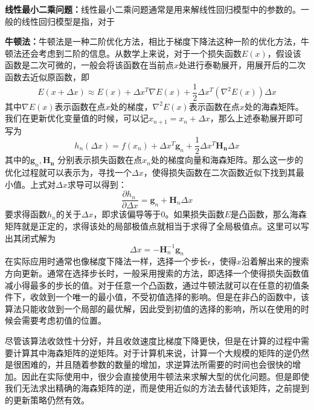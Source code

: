 \textbf{线性最小二乘问题：}线性最小二乘问题通常是用来解线性回归模型中的参数的。一般的线性回归模型是指，对于

\textbf{牛顿法：}牛顿法是一种二阶优化方法，相比于梯度下降法这种一阶的优化方法，牛顿法还会考虑到二阶的信息。从数学上来说，对于一个损失函数\(E(x)\)，假设该函数是二次可微的，一般会将该函数在当前点\(x\)处进行泰勒展开，用展开后的二次函数去近似原函数，即
\begin{equation}
    E(x+\Delta x) \approx E(x) + \Delta x^T \nabla E(x) + \frac{1}{2}\Delta x^T (\nabla^2 E(x))\Delta x
\end{equation}
其中\(\nabla E(x)\)表示函数在点\(x\)处的梯度，\(\nabla^2 E(x)\)表示函数在点\(x\)处的海森矩阵。我们在更新优化变量值的时候，可以记\(x_{n+1} = x_n + \Delta x\)，那么上述泰勒展开即可写为
\begin{equation}
    h_n(\Delta x) = f(x_n) + \Delta x^T \mathbf{g}_n + \frac{1}{2}\Delta x^T  \mathbf{H_n}\Delta x
\end{equation}
其中的\(\mathbf{g}_n, \mathbf{H_n}\) 分别表示损失函数在点\(x_n\)处的梯度向量和海森矩阵。那么这一步的优化过程就可以表示为，寻找一个\(\Delta x\)，使得损失函数在二次函数近似下找到其最小值。上式对\(\Delta x\)求导可以得到：
\begin{equation}
    \frac { \partial h _ { n }\ } { \partial \Delta x } = \mathbf { g } _ { n } + \mathbf { H } _ { n } \Delta x
\end{equation}
要求得函数\(h_n\)的关于\(\Delta x\)，即求该偏导等于0。如果损失函数\(E\)是凸函数，那么海森矩阵就是正定的，求得该处的局部极值点就相当于求得了全局极值点。这里可以写出其闭式解为
\begin{equation}\label{eq:newton}
    \Delta x = -  \mathbf { H } _ { n }^{-1} \mathbf { g } _ { n }
\end{equation}
在实际应用时通常也像梯度下降法一样，选择一个步长\(\epsilon\)，使得\(x\)沿着解出来的搜索方向更新。通常在选择步长时，一般采用搜索的方法，即选择一个使得损失函数值减小得最多的步长的值。对于任意一个凸函数，通过牛顿法就可以在任意的初值条件下，收敛到一个唯一的最小值，不受初值选择的影响。但是在非凸的函数中，该算法只能收敛到一个局部的最优解，因此受到初值的选择的影响，所以在使用的时候会需要考虑初值的位置。

尽管该算法收敛性十分好，并且收敛速度比梯度下降更快，但是在计算的过程中需要计算其中海森矩阵的逆矩阵。对于计算机来说，计算一个大规模的矩阵的逆仍然是很困难的，并且随着参数的数量的增加，求逆算法所需要的时间也会很快的增加。因此在实际使用中，很少会直接使用牛顿法来求解大型的优化问题。但是即使我们无法求出精确的海森矩阵的逆，而是使用近似的方法去替代该矩阵，之前提到的更新策略仍然有效。

